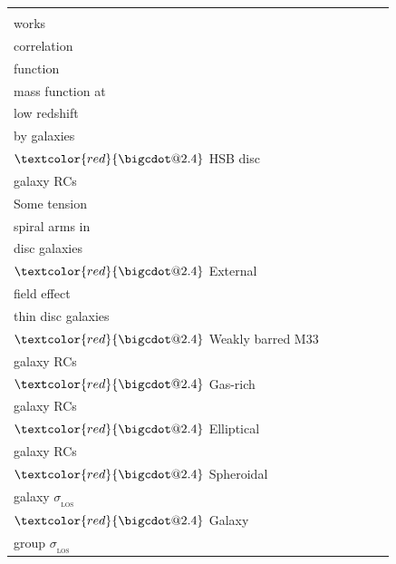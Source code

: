 \documentclass[fleqn,usenatbib,useAMS,onecolumn]{mnras} %
\makeatletter
\DeclareRobustCommand*\bigcdot{\mathpalette\bigcdot@{2.4}}
\DeclareRobustCommand*\bigcdot@[2]{\mathbin{\vcenter{\hbox{\scalebox{#2}{$\m@th#1\bullet$}}}}}
\makeatother
\begin{document}
\begin{table}
\begin{tabular}{llllll}
		\makecell{Plausibly \\ works} & \makecell{$\textcolor{red}{\bigcdot}$ Weak lensing \\ correlation \\ function} & \makecell{} & \makecell{$\textcolor{red}{\bigcdot}$ Galaxy cluster \\ mass function at \\ low redshift} & \makecell{} & \makecell{$\textcolor{red}{\bigcdot}$ Weak lensing \\ by galaxies \\ $\textcolor{red}{\bigcdot}$ HSB disc \\ galaxy RCs} \\ \hline
		Some tension & \makecell{$\textcolor{red}{\bigcdot}$ Number of \\ spiral arms in \\ disc galaxies \\ $\textcolor{red}{\bigcdot}$ External \\ field effect} & \makecell{} & \makecell{} & \makecell{$\textcolor{red}{\bigcdot}$ Prevalence of \\ thin disc galaxies \\ $\textcolor{red}{\bigcdot}$ Weakly barred M33} & \makecell{$\textcolor{red}{\bigcdot}$ LSB disc \\ galaxy RCs \\ $\textcolor{red}{\bigcdot}$ Gas-rich \\ galaxy RCs \\ $\textcolor{red}{\bigcdot}$  Elliptical \\ galaxy RCs \\ $\textcolor{red}{\bigcdot}$ Spheroidal \\ galaxy $\sigma_{_\text{LOS}}$ \\ $\textcolor{red}{\bigcdot}$ Galaxy \\ group $\sigma_{_\text{LOS}}$} \\ \hline

\end{tabular}
\end{table}
\end{document}
